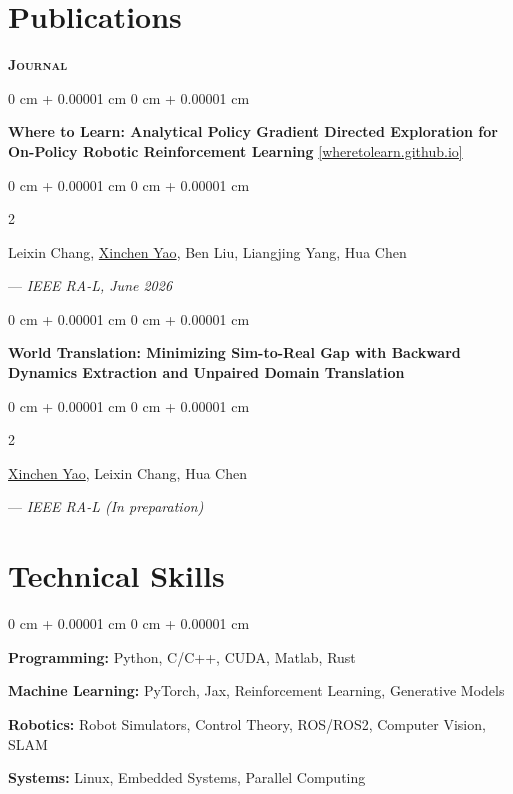 \documentclass[10pt, letterpaper]{article}
\newenvironment{onecolentry}{
    \begin{adjustwidth}{
        0 cm + 0.00001 cm
    }{
        0 cm + 0.00001 cm
    }
}{
    \end{adjustwidth}
} %
\newenvironment{twocolentry}[2][]{
    \onecolentry
    \def\secondColumn{#2}
    \setcolumnwidth{\fill, 4.5 cm}
    \begin{paracol}{2}
}{
    \switchcolumn \raggedleft \secondColumn
    \end{paracol}
    \endonecolentry
} %
\begin{document}
    \section{Publications}

        \textbf{\textsc{Journal}}

        \vspace{0.1 cm}

        \begin{onecolentry}
            \textbf{Where to Learn: Analytical Policy Gradient Directed Exploration for On-Policy Robotic Reinforcement Learning} \href{https://wheretolearn.github.io/}{[wheretolearn.github.io]}
        \end{onecolentry}

        \begin{twocolentry}{--- \textit{IEEE RA-L, June 2026}}
            Leixin Chang, \underline{Xinchen Yao}, Ben Liu, Liangjing Yang, Hua Chen
        \end{twocolentry}

        \vspace{0.2 cm}

        \begin{onecolentry}
            \textbf{World Translation: Minimizing Sim-to-Real Gap with Backward Dynamics Extraction and Unpaired Domain Translation}
        \end{onecolentry}

        \begin{twocolentry}{--- \textit{IEEE RA-L (In preparation)}}
            \underline{Xinchen Yao}, Leixin Chang, Hua Chen
        \end{twocolentry}

    \section{Technical Skills}

        \begin{onecolentry}
            \textbf{Programming:} Python, C/C++, CUDA, Matlab, Rust

            \vspace{0.10 cm}

            \textbf{Machine Learning:} PyTorch, Jax, Reinforcement Learning, Generative Models

            \vspace{0.10 cm}

            \textbf{Robotics:} Robot Simulators, Control Theory, ROS/ROS2, Computer Vision, SLAM

            \vspace{0.10 cm}

            \textbf{Systems:} Linux, Embedded Systems, Parallel Computing
        \end{onecolentry}
\end{document}
